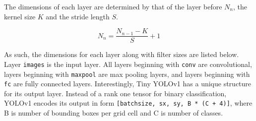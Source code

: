 \documentclass{article}
\begin{document}
The dimensions of each layer are determined by that of the layer before $N_n$, the kernel size $K$ and the stride length $S$.

\begin{equation}
N_n = \frac{N_{n-1} - K}{S} + 1
\end{equation}

As such, the dimensions for each layer along with filter sizes are listed below.  Layer \texttt{images} is the input layer. All layers beginning with \texttt{conv} are convolutional, layers beginning with \texttt{maxpool} are max pooling layers, and layers beginning with \texttt{fc} are fully connected layers. Interestingly, Tiny YOLOv1 has a unique structure for its output layer. Instead of a rank one tensor for binary classification, YOLOv1 encodes its output in form \texttt{[batchsize, sx, sy, B * (C + 4)]}, where B is number of bounding boxes per grid cell and C is number of classes.
\end{document}
